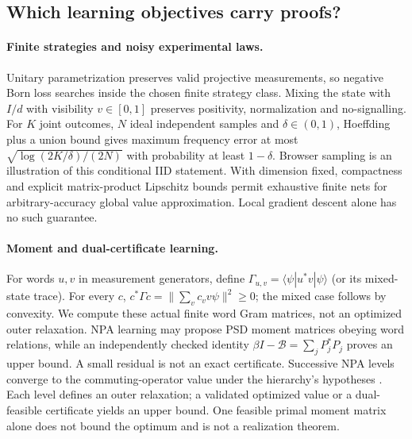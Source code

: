 \documentclass[11pt]{article}
\theoremstyle{definition}\newtheorem{definition}[theorem]{Definition}
\theoremstyle{remark}\newtheorem{remark}[theorem]{Remark}
\begin{document}
\subsection{Which learning objectives carry proofs?}
\paragraph{Finite strategies and noisy experimental laws.}
Unitary parametrization preserves valid projective measurements, so negative
Born loss searches inside the chosen finite strategy class. Mixing the state
with $I/d$ with visibility $v\in[0,1]$ preserves positivity, normalization and
no-signalling. For $K$ joint outcomes, $N$ ideal independent samples and
$\delta\in(0,1)$, Hoeffding plus a union bound gives maximum frequency error
at most $\sqrt{\log(2K/\delta)/(2N)}$ with probability at least $1-\delta$.
Browser sampling is an illustration of this conditional IID statement.
With dimension fixed, compactness and explicit matrix-product Lipschitz
bounds permit exhaustive finite nets for arbitrary-accuracy global value
approximation. Local gradient descent alone has no such guarantee.

\paragraph{Moment and dual-certificate learning.}
For words $u,v$ in measurement generators, define
$\Gamma_{u,v}=\langle\psi|u^*v|\psi\rangle$ (or its mixed-state trace).
For every $c$, $c^*\Gamma c=\|\sum_v c_vv\psi\|^2\ge0$; the mixed case
follows by convexity. We compute these actual finite word Gram matrices,
not an optimized outer relaxation. NPA learning may propose PSD moment
matrices obeying word relations, while an independently checked identity
$\beta I-\mathcal B=\sum_jP_j^*P_j$ proves an upper bound. A small residual
is not an exact certificate. Successive NPA levels converge to the
commuting-operator value under the hierarchy's hypotheses \cite{GameNPA}.
Each level defines an outer relaxation; a validated optimized value or a
dual-feasible certificate yields an upper bound. One feasible primal moment
matrix alone does not bound the optimum and is not a realization theorem.
\end{document}
